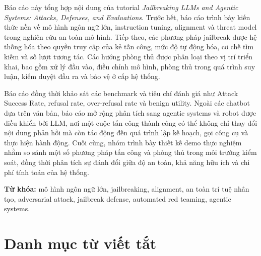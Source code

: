 \documentclass[12pt,a4paper]{article}
\begin{document}
Báo cáo này tổng hợp nội dung của tutorial
\textit{Jailbreaking LLMs and Agentic Systems: Attacks, Defenses,
and Evaluations}. Trước hết, báo cáo trình bày kiến thức nền về mô hình
ngôn ngữ lớn, instruction tuning, alignment và threat model trong
nghiên cứu an toàn mô hình. Tiếp theo, các phương pháp jailbreak được
hệ thống hóa theo quyền truy cập của kẻ tấn công, mức độ tự động hóa,
cơ chế tìm kiếm và số lượt tương tác. Các hướng phòng thủ được phân
loại theo vị trí triển khai, bao gồm xử lý đầu vào, điều chỉnh mô hình,
phòng thủ trong quá trình suy luận, kiểm duyệt đầu ra và bảo vệ ở cấp
hệ thống.

Báo cáo đồng thời khảo sát các benchmark và tiêu chí đánh giá như
Attack Success Rate, refusal rate, over-refusal rate và benign utility.
Ngoài các chatbot dựa trên văn bản, báo cáo mở rộng phân tích sang
agentic systems và robot được điều khiển bởi LLM, nơi một cuộc tấn công
thành công có thể không chỉ thay đổi nội dung phản hồi mà còn tác động
đến quá trình lập kế hoạch, gọi công cụ và thực hiện hành động. Cuối
cùng, nhóm trình bày thiết kế demo thực nghiệm nhằm so sánh một số
phương pháp tấn công và phòng thủ trong môi trường kiểm soát, đồng thời
phân tích sự đánh đổi giữa độ an toàn, khả năng hữu ích và chi phí tính
toán của hệ thống.

\textbf{Từ khóa:}
mô hình ngôn ngữ lớn, jailbreaking, alignment, an toàn trí tuệ nhân tạo,
adversarial attack, jailbreak defense, automated red teaming,
agentic systems.

\newpage

\tableofcontents
\newpage

\section*{Danh mục từ viết tắt}
\end{document}
